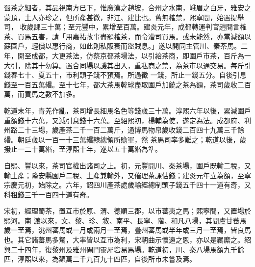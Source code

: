 \begin{pinyinscope}
 蜀茶之細者，其品視南方已下，惟廣漢之趙坡，合州之水南，峨眉之白牙，雅安之蒙頂，土人亦珍之，但所產甚微，非江、建比也。舊無榷禁，熙寧間，始置提舉司，
 收歲課三十萬；至元豐中，累增至百萬。建炎元年，成都轉運判官趙開言榷茶、買馬五害，請「用嘉祐故事盡罷榷茶，而令漕司買馬。或未能然，亦當減額以蘇園戶，輕價以惠行商，如此則私販衰而盜賊息。」遂以開同主管川、秦茶馬。二年，開至成都，大更茶法，仿蔡京都茶場法，以引給茶商，即園戶市茶，百斤為一大引，除其十勿算。置合同場以譏其出入，重私商之禁，為茶市以通交易。每斤引錢春七十、夏五十，市利頭子錢不預焉。所過徵
 一錢，所止一錢五分。自後引息錢至一百五萬緡。至十七年，都大茶馬韓球盡取園戶加饒之茶為額，茶司歲收二百萬，而買馬之數不加多。



 乾道末年，青羌作亂，茶司增長細馬名色等錢歲三十萬。淳熙六年以後，累減園戶重額錢十六萬，又減引息錢十六萬。至紹熙初，楊輔為使，遂定為法。成都府、利州路二十三場，歲產茶二千一百二萬斤，通博馬物帛歲收錢二百四十九萬三千餘緡。朝廷歲以一百一十三萬緡隸總領所贍軍，然
 茶馬司率多難之；乾道以後，歲撥止一二十萬緡，至淳熙十年，遂以五十萬緡為準。



 自熙、豐以來，茶司官權出諸司之上。初，元豐開川、秦茶場，園戶既輸二稅，又輸土產；隆安縣園戶二稅、土產兼輸外，又催理茶課估錢；建炎元年立為額，至寧宗慶元初，始除之。六年，詔四川產茶處歲輸經總制頭子錢五千四十一道有奇，又科租錢三千一百四十道有奇。



 宋初，經理蜀茶，置互市於原、渭、德順三郡，以市蕃夷之馬；熙寧間，又置場於熙河。南
 渡以來，文、黎、珍、敘、南平、長寧、階、和凡八場，其間盧甘蕃馬歲一至焉，洮州蕃馬或一月或兩月一至焉，疊州蕃馬或半年或三月一至焉，皆良馬也。其它諸蕃馬多駑，大率皆以互市為利，宋朝曲示懷遠之恩，亦以是羈縻之。紹興二十四年，復黎州及雅州碉門靈犀砦易馬場。乾道初，川、秦八場馬額九千餘匹，淳熙以來，為額萬二千九百九十四匹，自後所市未嘗及焉。



\end{pinyinscope}